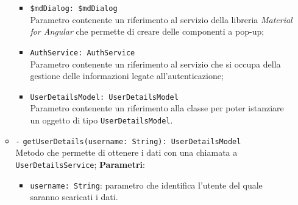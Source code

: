 \begin{itemize}
\begin{itemize}
\begin{itemize}
					\item \texttt{\$mdDialog: \$mdDialog} \\
					Parametro contenente un riferimento al servizio della libreria \textit{Material for Angular} che permette di creare delle componenti a pop-up;
					\item \texttt{AuthService: AuthService} \\
					Parametro contenente un riferimento al servizio che si occupa della gestione delle informazioni legate all’autenticazione;
					\item \texttt{UserDetailsModel: UserDetailsModel} \\
					Parametro contenente un riferimento alla classe per poter istanziare un oggetto di tipo \texttt{UserDetailsModel}.
				\end{itemize}
				\item \texttt{-} \texttt{getUserDetails(username: String): UserDetailsModel} \\ Metodo che permette di ottenere i dati con una chiamata a \texttt{UserDetailsService};
				\textbf{Parametri}:
				\begin{itemize}
					\item \texttt{username: String}: parametro che identifica l'utente del quale saranno scaricati i dati.
				\end{itemize}
				
			\end{itemize}
		\end{itemize}
		